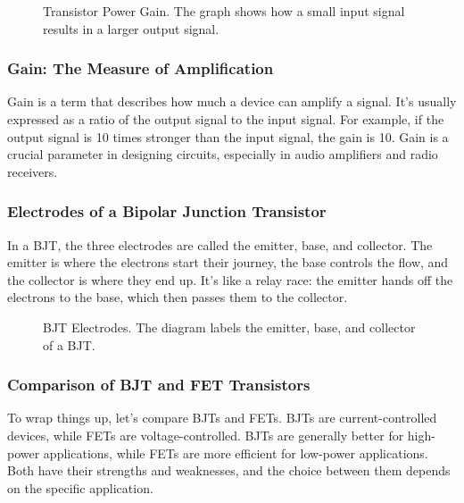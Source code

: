 \begin{figure}[h!]
    \centering
    \caption{Transistor Power Gain. The graph shows how a small input signal results in a larger output signal.}
    \label{fig:transistor_power_gain}
\end{figure}

\subsubsection*{Gain: The Measure of Amplification}
Gain is a term that describes how much a device can amplify a signal. It’s usually expressed as a ratio of the output signal to the input signal. For example, if the output signal is 10 times stronger than the input signal, the gain is 10. Gain is a crucial parameter in designing circuits, especially in audio amplifiers and radio receivers.

\subsubsection*{Electrodes of a Bipolar Junction Transistor}
In a BJT, the three electrodes are called the emitter, base, and collector. The emitter is where the electrons start their journey, the base controls the flow, and the collector is where they end up. It’s like a relay race: the emitter hands off the electrons to the base, which then passes them to the collector.

\begin{figure}[h!]
    \centering
    \caption{BJT Electrodes. The diagram labels the emitter, base, and collector of a BJT.}
    \label{fig:bjt_electrodes}
\end{figure}

\subsubsection*{Comparison of BJT and FET Transistors}
To wrap things up, let’s compare BJTs and FETs. BJTs are current-controlled devices, while FETs are voltage-controlled. BJTs are generally better for high-power applications, while FETs are more efficient for low-power applications. Both have their strengths and weaknesses, and the choice between them depends on the specific application.

